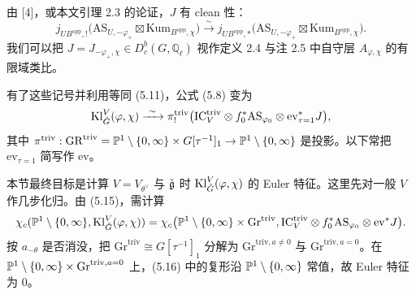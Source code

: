 \begin{remark}
由 [4]，或本文引理 2.3 的论证，$J$ 有 clean 性：
\[
j_{UB^{\mathrm{opp}},!}\big(\mathrm{AS}_{U,-\varphi_+}\boxtimes\mathrm{Kum}_{B^{\mathrm{opp}},\chi}\big)\xrightarrow{\ \sim\ }j_{UB^{\mathrm{opp}},*}\big(\mathrm{AS}_{U,-\varphi_+}\boxtimes\mathrm{Kum}_{B^{\mathrm{opp}},\chi}\big).
\]
我们可以把 $J=J_{-\varphi_+,\chi}\in D^b_c(G,\mathbb{Q}_\ell)$ 视作定义 2.4 与注 2.5 中自守层 $A_{\varphi,\chi}$ 的有限域类比。
\end{remark}

有了这些记号并利用等同 (5.11)，公式 (5.8) 变为
\begin{equation}
\Kl^V_{\ckG}(\varphi,\chi)\xrightarrow{\ \sim\ }\pi^{\mathrm{triv}}_!\big(\mathrm{IC}^{\mathrm{triv}}_V\otimes f_0^*\mathrm{AS}_{\varphi_0}\otimes\mathrm{ev}^*_{\tau=1}J\big),
\end{equation}
其中 $\pi^{\mathrm{triv}}:\mathrm{GR}^{\mathrm{triv}}=\mathbb{P}^1\setminus\{0,\infty\}\times G[\tau^{-1}]_1\to\mathbb{P}^1\setminus\{0,\infty\}$ 是投影。以下常把 $\mathrm{ev}_{\tau=1}$ 简写作 $\mathrm{ev}$。

本节最终目标是计算 $V=V_{\theta^\vee}$ 与 $\check{\mathfrak g}$ 时 $\mathrm{Kl}^V_{\check G}(\varphi,\chi)$ 的 Euler 特征。这里先对一般 $V$ 作几步化归。由 (5.15)，需计算
\begin{equation}
\chi_c(\mathbb{P}^1\setminus\{0,\infty\},\mathrm{Kl}^V_{\check G}(\varphi,\chi))=\chi_c\big(\mathbb{P}^1\setminus\{0,\infty\}\times\mathrm{Gr}^{\mathrm{triv}},\mathrm{IC}^{\mathrm{triv}}_V\otimes f_0^*\mathrm{AS}_{\varphi_0}\otimes\mathrm{ev}^*J\big).
\end{equation}
按 $a_{-\theta}$ 是否消没，把 $\mathrm{Gr}^{\mathrm{triv}}\cong G[\tau^{-1}]_1$ 分解为 $\mathrm{Gr}^{\mathrm{triv},a\neq 0}$ 与 $\mathrm{Gr}^{\mathrm{triv},a=0}$。在 $\mathbb{P}^1\setminus\{0,\infty\}\times\mathrm{Gr}^{\mathrm{triv},a=0}$ 上，(5.16) 中的复形沿 $\mathbb{P}^1\setminus\{0,\infty\}$ 常值，故 Euler 特征为 $0$。

